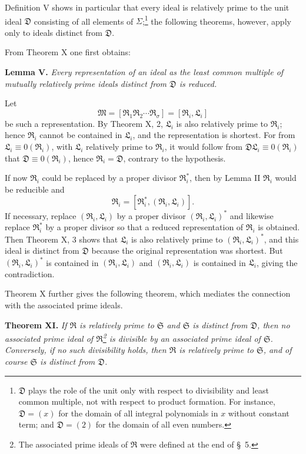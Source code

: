\documentclass[11pt]{article}
\providecommand{\ideal}[1]{\mathfrak{#1}}
\begin{document}
Definition V shows in particular that every ideal is relatively prime to the unit ideal $\ideal D$ consisting of all elements of $\Sigma$;\footnote{$\ideal D$ plays the role of the unit only with respect to divisibility and least common multiple, not with respect to product formation. For instance, $\ideal D=(x)$ for the domain of all integral polynomials in $x$ without constant term; and $\ideal D=(2)$ for the domain of all even numbers.} the following theorems, however, apply only to ideals distinct from $\ideal D$.

From Theorem X one first obtains:

\textbf{Lemma V.} \emph{Every representation of an ideal as the least common multiple of mutually relatively prime ideals distinct from $\ideal D$ is reduced.}

Let
\[
 \ideal M=[\ideal R_1\ideal R_2\cdots\ideal R_\sigma]=[\ideal R_i,
\ideal L_i]
\]
be such a representation. By Theorem X, 2, $\ideal L_i$ is also relatively prime to $\ideal R_i$; hence $\ideal R_i$ cannot be contained in $\ideal L_i$, and the representation is shortest. For from $\ideal L_i\equiv0(\ideal R_i)$, with $\ideal L_i$ relatively prime to $\ideal R_i$, it would follow from $\ideal D\ideal L_i\equiv0(\ideal R_i)$ that $\ideal D\equiv0(\ideal R_i)$, hence $\ideal R_i=\ideal D$, contrary to the hypothesis.

If now $\ideal R_i$ could be replaced by a proper divisor $\ideal R_i^*$, then by Lemma II $\ideal R_i$ would be reducible and
\[
 \ideal R_i=[\ideal R_i^*,(\ideal R_i,
\ideal L_i)].
\]
If necessary, replace $(\ideal R_i,
\ideal L_i)$ by a proper divisor $(\ideal R_i,
\ideal L_i)^*$ and likewise replace $\ideal R_i^*$ by a proper divisor so that a reduced representation of $\ideal R_i$ is obtained. Then Theorem X, 3 shows that $\ideal L_i$ is also relatively prime to $(\ideal R_i,
\ideal L_i)^*$, and this ideal is distinct from $\ideal D$ because the original representation was shortest. But $(\ideal R_i,
\ideal L_i)^*$ is contained in $(\ideal R_i,
\ideal L_i)$ and $(\ideal R_i,
\ideal L_i)$ is contained in $\ideal L_i$, giving the contradiction.

Theorem X further gives the following theorem, which mediates the connection with the associated prime ideals.

\textbf{Theorem XI.} \emph{If $\ideal R$ is relatively prime to $\ideal S$ and $\ideal S$ is distinct from $\ideal D$, then no associated prime ideal of $\ideal R$\footnote{The associated prime ideals of $\ideal R$ were defined at the end of \S~5.} is divisible by an associated prime ideal of $\ideal S$. Conversely, if no such divisibility holds, then $\ideal R$ is relatively prime to $\ideal S$, and of course $\ideal S$ is distinct from $\ideal D$.}
\end{document}
